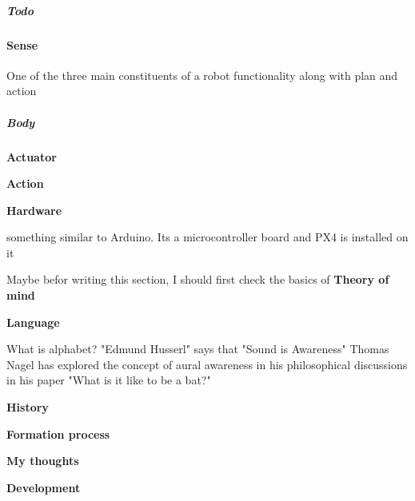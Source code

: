 \documentclass{book}
\providecommand{\ProjectDeepHeading}[2]{%
    \par\medskip\noindent\textbf{#2}\par\smallskip
}
\begin{document}
\subparagraph{Todo}


\paragraph{Sense}
One of the three main constituents of a robot functionality along with plan and action

\subparagraph{Body}

\ProjectDeepHeading{1}{Actuator}


\ProjectDeepHeading{3}{Action}

\ProjectDeepHeading{1}{Hardware}


something similar to Arduino. Its a microcontroller board and PX4 is installed on it


Maybe befor writing this section, I should first check the basics of \textbf{Theory of mind}


\ProjectDeepHeading{2}{Language}

What is alphabet? "Edmund Husserl" says that "Sound is Awareness" Thomas Nagel has explored the concept of aural awareness in his philosophical discussions in his paper "What is it like to be a bat?"

\ProjectDeepHeading{3}{History}

\ProjectDeepHeading{3}{Formation process}
    \ProjectDeepHeading{4}{My thoughts}
        
        \ProjectDeepHeading{6}{Development}
            
            \begin{figure}[H]
                \raggedright
            \end{figure}
            
\end{document}
